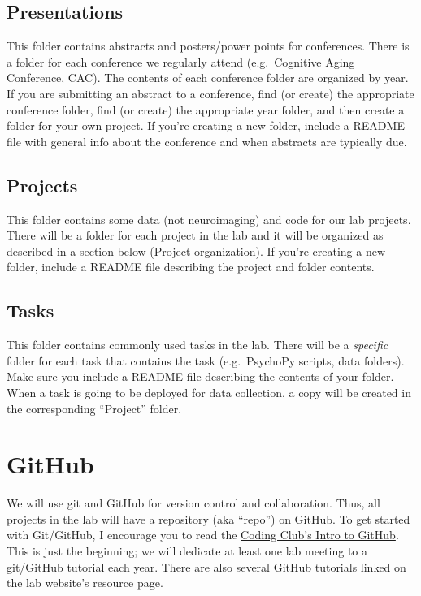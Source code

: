\documentclass[
]{book}
\begin{document}
\hypertarget{presentations}{%
\subsection{Presentations}\label{presentations}}

This folder contains abstracts and posters/power points for conferences. There is a folder for each conference we regularly attend (e.g.~Cognitive Aging Conference, CAC). The contents of each conference folder are organized by year. If you are submitting an abstract to a conference, find (or create) the appropriate conference folder, find (or create) the appropriate year folder, and then create a folder for your own project. If you're creating a new folder, include a README file with general info about the conference and when abstracts are typically due.

\hypertarget{projects}{%
\subsection{Projects}\label{projects}}

This folder contains some data (not neuroimaging) and code for our lab projects. There will be a folder for each project in the lab and it will be organized as described in a section below (Project organization). If you're creating a new folder, include a README file describing the project and folder contents.

\hypertarget{tasks}{%
\subsection{Tasks}\label{tasks}}

This folder contains commonly used tasks in the lab. There will be a \emph{specific} folder for each task that contains the task (e.g.~PsychoPy scripts, data folders). Make sure you include a README file describing the contents of your folder. When a task is going to be deployed for data collection, a copy will be created in the corresponding ``Project'' folder.

\hypertarget{github}{%
\section{GitHub}\label{github}}

We will use git and GitHub for version control and collaboration. Thus, all projects in the lab will have a repository (aka ``repo'') on GitHub. To get started with Git/GitHub, I encourage you to read the \href{https://ourcodingclub.github.io/2017/02/27/git.html}{Coding Club's Intro to GitHub}. This is just the beginning; we will dedicate at least one lab meeting to a git/GitHub tutorial each year. There are also several GitHub tutorials linked on the lab website's resource page.
\end{document}
